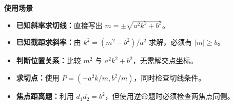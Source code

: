 \begin{explanationbox}
\medskip
\textbf{\textcolor{CExplanation}{使用场景}}
\begin{itemize}[leftmargin=*, itemsep=0.4em, topsep=0.3em]
\item \textbf{已知斜率求切线：}直接写出 $m=\pm\sqrt{a^2k^2+b^2}$。
\item \textbf{已知截距求斜率：}由 $k^2=(m^2-b^2)/a^2$ 求解，必须有 $|m|\ge b$。
\item \textbf{判断位置关系：}比较 $m^2$ 与 $a^2k^2+b^2$，无需解交点坐标。
\item \textbf{求切点：}使用 $P=(-a^2k/m,b^2/m)$，同时检查切线条件。
\item \textbf{焦点距离题：}利用 $d_1d_2=b^2$，但使用逆命题时必须检查两焦点同侧。
\end{itemize}
\end{explanationbox}
